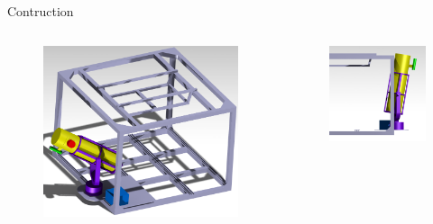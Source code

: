 \documentclass[11pt, aspectratio=169]{beamer}
\begin{document}
\begin{frame}{Contruction}
\vspace{-1cm}
\begin{columns}[t]
	\begin{column}{0.4\textwidth}
		\begin{figure}
		\centering		\includegraphics[scale=0.9]{figures/CAD/Outside_Gondola/Iso2.png}
		\end{figure}
	\end{column}
	
	\begin{column}{0.4\textwidth}
		\begin{figure}
		\centering
	\includegraphics[scale=1.3]{figures/CAD/Outside_Gondola/Vertical_lim.png}
		\end{figure}
	\end{column}
\end{columns}
\end{frame}
\end{document}
